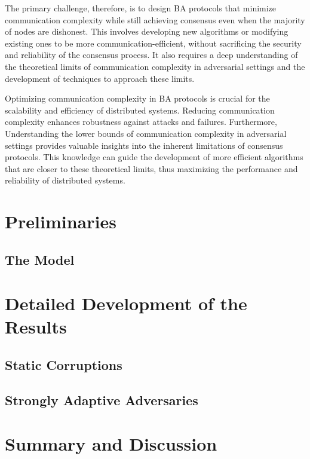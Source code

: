 \documentclass[11pt]{article}
\begin{document}
The primary challenge, therefore, is to design BA protocols that minimize communication complexity while still achieving consensus even when the majority of nodes are dishonest. This involves developing new algorithms or modifying existing ones to be more communication-efficient, without sacrificing the security and reliability of the consensus process. It also requires a deep understanding of the theoretical limits of communication complexity in adversarial settings and the development of techniques to approach these limits.

Optimizing communication complexity in BA protocols is crucial for the scalability and efficiency of distributed systems. Reducing communication complexity enhances robustness against attacks and failures. Furthermore, Understanding the lower bounds of communication complexity in adversarial settings provides valuable insights into the inherent limitations of consensus protocols. This knowledge can guide the development of more efficient algorithms that are closer to these theoretical limits, thus maximizing the performance and reliability of distributed systems.

\section{Preliminaries}
\subsection{The Model}


\section{Detailed Development of the Results}
\subsection{Static Corruptions}

\subsection{Strongly Adaptive Adversaries}


\section{Summary and Discussion}



\cite{BBCL}
\cite{CPS}
\cite{TLC}
\cite{WXSD}




\end{document}
